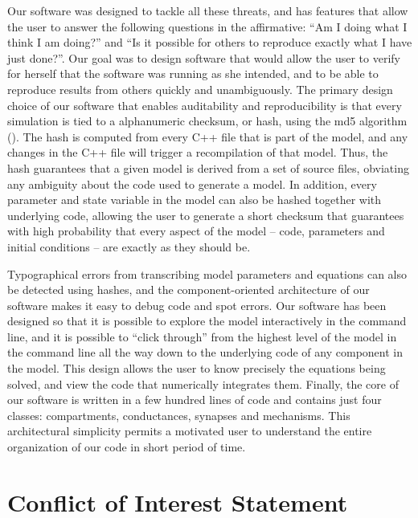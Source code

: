 \documentclass{frontiersSCNS} %
\begin{document}
Our software was designed to tackle all these threats, and has features that allow the user to answer the following questions in the affirmative: ``Am I doing what I think I am doing?'' and ``Is it possible for others to reproduce exactly what I have just done?''. Our goal was to design software that would allow the user to verify for herself that the software was running as she intended, and to be able to reproduce results from others quickly and unambiguously. The primary design choice of our software that enables auditability and reproducibility is that every simulation is tied to a alphanumeric checksum, or hash, using the md5 algorithm (\cite{rivestMD5MessageDigestAlgorithm1992}). The hash is computed from every C++ file that is part of the model, and any changes in the C++ file will trigger a recompilation of that model. Thus, the hash guarantees that a given model is derived from a set of source files, obviating any ambiguity about the code used to generate a model. In addition, every parameter and state variable in the model can also be hashed together with underlying code, allowing the user to generate a short checksum that guarantees with high probability that every aspect of the model -- code, parameters and initial conditions -- are exactly as they should be.

Typographical errors from transcribing model parameters and equations can also be detected using hashes, and the component-oriented architecture of our software makes it easy to debug code and spot errors. Our software has been designed so that it is possible to explore the model interactively in the command line, and it is possible to ``click through'' from the highest level of the model in the command line all the way down to the underlying code of any component in the model. This design allows the user to know precisely the equations being solved, and view the code that numerically integrates them. Finally, the core of our software is written in a few hundred lines of code and contains just four classes: compartments, conductances, synapses and mechanisms. This architectural simplicity permits a motivated user to understand the entire organization of our code in short period of time.





%
%
%
%
%
%

\section*{Conflict of Interest Statement}
\end{document}
